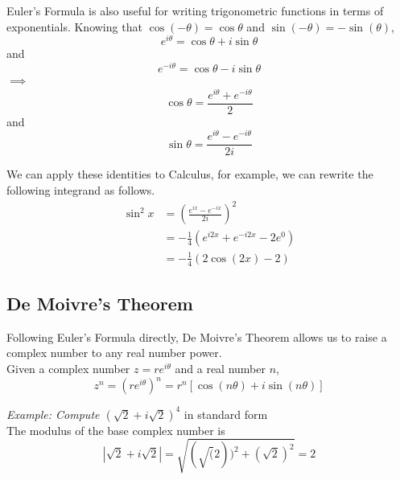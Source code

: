         \noindent Euler's Formula is also useful for writing trigonometric functions in terms
        of exponentials. Knowing that $\cos{(-\theta)}=\cos{\theta}$ and $\sin{(-\theta)}=-\sin{(\theta)}$,
        \begin{equation*}
            e^{i\theta}=\cos\theta+i\sin\theta
        \end{equation*}
        and
        \begin{equation*}
            e^{-i\theta}=\cos\theta-i\sin\theta
        \end{equation*}
        $\implies$
        \begin{equation*}
            \cos\theta=\frac{e^{i\theta}+e^{-i\theta}}{2}
        \end{equation*}
        and
        \begin{equation*}
            \sin\theta=\frac{e^{i\theta}-e^{-i\theta}}{2i}
        \end{equation*}

        \noindent We can apply these identities to Calculus, for example, we can rewrite the
        following integrand as follows. \\
        \begin{align*}
            \sin^2{x} &= \left(\frac{e^{ix}-e^{-ix}}{2i}\right)^2 \\
            &= -\frac{1}{4}(e^{i2x}+e^{-i2x}-2e^0) \\
            &= -\frac{1}{4}(2\cos{(2x)}-2)
        \end{align*}



    \subsection{De Moivre's Theorem}

        Following Euler's Formula directly, De Moivre's Theorem allows us to raise a complex number
        to any real number power. \\

        \noindent Given a complex number $z=re^{i\theta}$ and a real number $n$, \\
        \begin{equation*}
            z^n = (re^{i\theta})^n=r^n[\cos{(n\theta)}+i\sin{(n\theta)}]
        \end{equation*}

        \noindent \textit{Example: Compute $(\sqrt{2}+i\sqrt{2})^4$} in standard form \\
        The modulus of the base complex number is \\
        \begin{equation*}
            |\sqrt{2}+i\sqrt{2}| = \sqrt{(\sqrt(2))^2+(\sqrt{2})^2} = 2
        \end{equation*}




